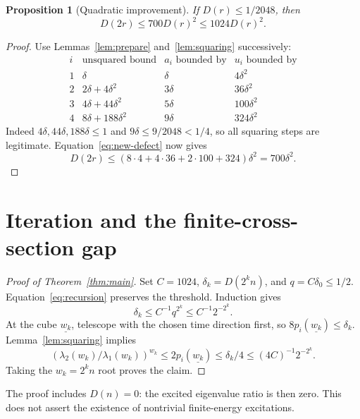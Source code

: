 \documentclass[11pt]{article}
\newtheorem{proposition}[theorem]{Proposition}
\theoremstyle{definition}
\theoremstyle{remark}
\begin{document}
\begin{proposition}[Quadratic improvement]\label{prop:recursion}
If $D(r)\le1/2048$, then
\begin{equation}
 D(2r)\le700D(r)^2\le1024D(r)^2.\label{eq:recursion}
\end{equation}
\end{proposition}
\begin{proof}
Use Lemmas~\ref{lem:prepare} and~\ref{lem:squaring} successively:
\[
\begin{array}{c|l|c|c}
 i&\text{unsquared bound}&a_i\text{ bounded by}&u_i\text{ bounded by}\\\hline
 1&\delta&\delta&4\delta^2\\
 2&2\delta+4\delta^2&3\delta&36\delta^2\\
 3&4\delta+44\delta^2&5\delta&100\delta^2\\
 4&8\delta+188\delta^2&9\delta&324\delta^2
\end{array}
\]
Indeed $4\delta,44\delta,188\delta\le1$ and
$9\delta\le9/2048<1/4$, so all squaring steps are legitimate.
Equation~\eqref{eq:new-defect} now gives
\[
 D(2r)\le(8\cdot4+4\cdot36+2\cdot100+324)\delta^2=700\delta^2.
\]
\end{proof}

\section{Iteration and the finite-cross-section gap}
\begin{proof}[Proof of Theorem~\ref{thm:main}]
Set $C=1024$, $\delta_k=D(2^kn)$, and $q=C\delta_0\le1/2$.
Equation~\eqref{eq:recursion} preserves the threshold. Induction gives
\begin{equation}
 \delta_k\le C^{-1}q^{2^k}\le C^{-1}2^{-2^k}.\label{eq:iterate}
\end{equation}
At the cube $\underline{w_k}$, telescope with the chosen time direction
first, so $8p_i(\underline{w_k})\le\delta_k$.
Lemma~\ref{lem:squaring} implies
\[
 (\lambda_2(w_k)/\lambda_1(w_k))^{w_k}
 \le2p_i(\underline{w_k})\le\delta_k/4
 \le(4C)^{-1}2^{-2^k}.
\]
Taking the $w_k=2^kn$ root proves the claim.
\end{proof}
The proof includes $D(n)=0$: the excited eigenvalue ratio is then zero.
This does not assert the existence of nontrivial finite-energy excitations.
\end{document}
